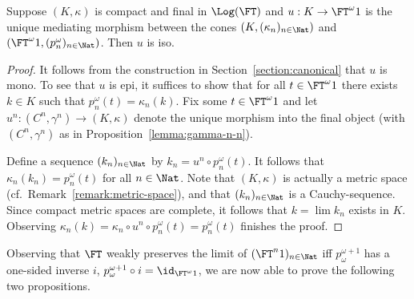 \documentclass{entcs}
\begin{document}
\begin{lemma}
  Suppose $(K, \kappa)$ is compact and final in $\Log(\FT)$ and $u: K
  \to \FT^{\omega} 1$ is the unique mediating morphism between the
  cones $(K, (\kappa_n)_{n \in \Nat})$ and $(\FT^{\omega} 1,
  (p^\omega_n)_{n \in \Nat})$. Then $u$ is iso.
\end{lemma}
\begin{proof}
  It follows from the construction in Section~\ref{section:canonical}
  that $u$ is mono. To see that $u$ is epi, it suffices to show that
  for all $t \in \FT^{\omega} 1$ there exists $k \in K$ such that
  $p^\omega_n (t) = \kappa_n(k)$.  Fix some $t \in \FT^{\omega} 1$ and
  let $u^n: (C^n, \gamma^n) \to (K, \kappa)$ denote the unique
  morphism into the final object (with $(C^n, \gamma^n)$ as in
  Proposition~\ref{lemma:gamma-n-n}).
  
  \sskip Define a sequence $(k_n)_{n \in \Nat}$ by $k_n = u^n \circ
  p^\omega_n (t)$.  It follows that $\kappa_n(k_n) = p^\omega_n(t)$
  for all $n \in \Nat$. Note that $(K, \kappa)$ is actually a metric
  space (cf.\ Remark~\ref{remark:metric-space}), and that $(k_n)_{n \in
    \Nat}$ is a Cauchy-sequence. Since compact metric spaces are
  complete, it follows
that $k=\lim k_n$ exists in $K$. Observing $\kappa_n(k)= \kappa_n\circ u^n
\circ p^\omega_n (t)= p^\omega_n (t)$ finishes the proof.
\end{proof}

Observing that $\FT$ weakly preserves the limit of $(\FT^n 1)_{n \in
  \Nat}$ iff $p^{\omega+1}_{\omega}$ has a one-sided inverse $i$,
$p^{\omega+1}_{\omega}\circ i = \id_{\FT^\omega 1}$, we are now able
to prove the following two propositions. 
\end{document}
